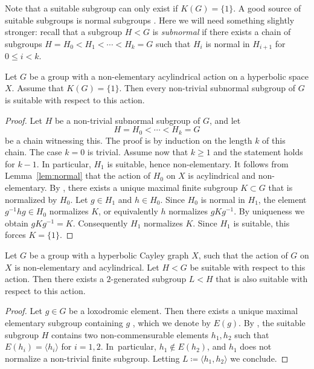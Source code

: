 Note that a suitable subgroup can only exist if $K(G) = \{ 1 \}$.
A good source of suitable subgroups is normal subgroups \cite[Lem.\,3.23]{CIOS}. Here we will need something slightly stronger: recall that a subgroup $H < G$ is \emph{subnormal} if there exists a chain of subgroups $H = H_0 < H_1 < \cdots < H_k = G$ such that $H_i$ is normal in $H_{i+1}$ for $0 \leq i < k$.

\begin{lemma}
\label{lem:normal:suitable}
Let $G$ be a group with a non-elementary acylindrical action on a hyperbolic space $X$.
Assume that $K(G) = \{1\}$.
Then every non-trivial subnormal subgroup of $G$ is suitable with respect to this action.
\end{lemma}

\begin{proof}
Let $H$ be a non-trivial subnormal subgroup of $G$, and let
\[
H = H_0 < \cdots < H_k = G
\]
be a chain witnessing this.
The proof is by induction on the length $k$ of this chain.
The case $k = 0$ is trivial.
Assume now that $k \geq 1$ and the statement holds for $k-1$.
In particular, $H_1$ is suitable, hence non-elementary.
It follows from Lemma~\ref{lem:normal} that the action of $H_0$ on $X$ is acylindrical and non-elementary.
By \cite[Lem.\,5.5]{hull}, there exists a unique maximal finite subgroup $K \subset G$ that is normalized by $H_0$. Let $g \in H_1$ and $h \in H_0$.
Since $H_0$ is normal in $H_1$, the element $g^{-1}hg \in H_0$ normalizes $K$, or equivalently $h$ normalizes $gKg^{-1}$.
By uniqueness we obtain $gKg^{-1} = K$.
Consequently $H_1$ normalizes $K$.
Since $H_1$ is suitable, this forces $K = \{1\}$.
\end{proof}

\begin{lemma}
\label{lem:suitable:rank2}
Let $G$ be a group with a hyperbolic Cayley graph $X$, such that the action of $G$ on $X$ is non-elementary and acylindrical.
Let $H < G$ be suitable with respect to this action. Then there exists a $2$-generated subgroup $L < H$ that is also suitable with respect to this action.
\end{lemma}

\begin{proof}
Let $g \in G$ be a loxodromic element. Then there exists a unique maximal elementary subgroup containing $g$ \cite[Lem.\,6.5, Cor.\,6.6]{DGO}, which we denote by $E(g)$. By \cite[Cor.\,5.7]{hull}, the suitable subgroup $H$ contains two non-commensurable elements $h_1, h_2$ such that $E(h_i) = \langle h_i \rangle$ for $i = 1, 2$. In~particular, $h_1 \notin E(h_2)$, and $h_1$ does not normalize a non-trivial finite subgroup. Letting $L \coloneqq \langle h_1, h_2 \rangle$ we conclude.
\end{proof}

